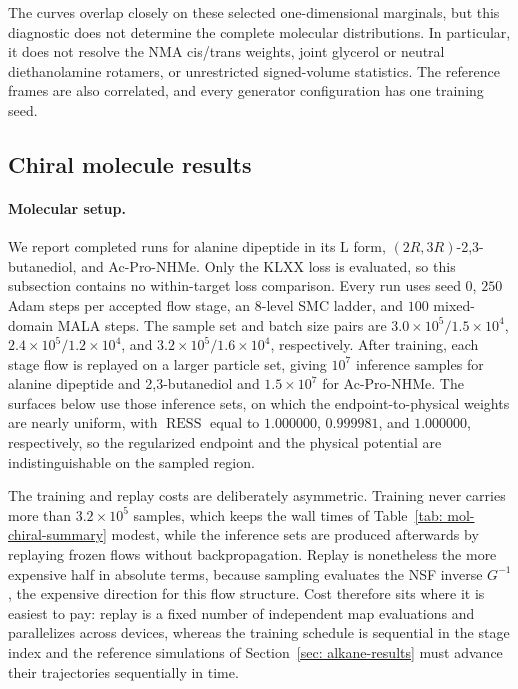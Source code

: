 \documentclass{article}
\begin{document}
The curves overlap closely on these selected one-dimensional marginals, but this diagnostic does not determine the complete molecular distributions. In particular, it does not resolve the NMA cis/trans weights, joint glycerol or neutral diethanolamine rotamers, or unrestricted signed-volume statistics. The reference frames are also correlated, and every generator configuration has one training seed.


\subsection{Chiral molecule results}
\label{sec: mol-chiral-results}

\paragraph{Molecular setup.}
We report completed runs for alanine dipeptide in its \(\mathrm L\) form, \((2R,3R)\)-2,3-butanediol, and Ac-Pro-NHMe. Only the KLXX loss is evaluated, so this subsection contains no within-target loss comparison. Every run uses seed \(0\), \(250\) Adam steps per accepted flow stage, an \(8\)-level SMC ladder, and \(100\) mixed-domain MALA steps. The sample set and batch size pairs are \(3.0\times10^5/1.5\times10^4\), \(2.4\times10^5/1.2\times10^4\), and \(3.2\times10^5/1.6\times10^4\), respectively. After training, each stage flow is replayed on a larger particle set, giving \(10^7\) inference samples for alanine dipeptide and 2,3-butanediol and \(1.5\times10^7\) for Ac-Pro-NHMe. The surfaces below use those inference sets, on which the endpoint-to-physical weights are nearly uniform, with \(\operatorname{RESS}\) equal to \(1.000000\), \(0.999981\), and \(1.000000\), respectively, so the regularized endpoint and the physical potential are indistinguishable on the sampled region.

The training and replay costs are deliberately asymmetric. Training never carries more than \(3.2\times10^5\) samples, which keeps the wall times of Table~\ref{tab: mol-chiral-summary} modest, while the inference sets are produced afterwards by replaying frozen flows without backpropagation. Replay is nonetheless the more expensive half in absolute terms, because sampling evaluates the NSF inverse \(G^{-1}\), the expensive direction for this flow structure. Cost therefore sits where it is easiest to pay: replay is a fixed number of independent map evaluations and parallelizes across devices, whereas the training schedule is sequential in the stage index and the reference simulations of Section~\ref{sec: alkane-results} must advance their trajectories sequentially in time.
\end{document}
